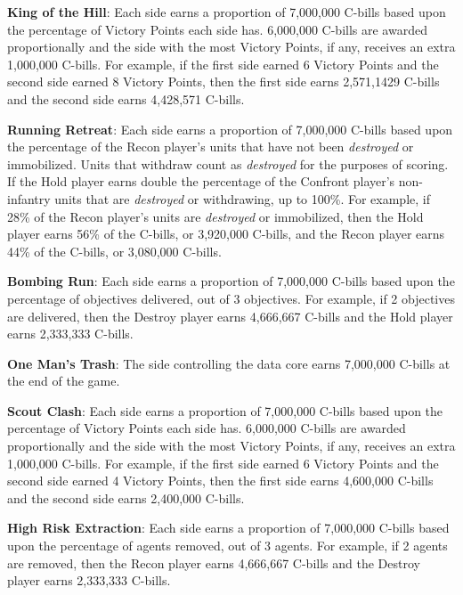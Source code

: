 \begin{description}
\item {\bfseries King of the Hill}: Each side earns a proportion of 7,000,000 C-bills based upon the percentage of Victory Points each side has.
6,000,000 C-bills are awarded proportionally and the side with the most Victory Points, if any, receives an extra 1,000,000 C-bills.
For example, if the first side earned 6 Victory Points and the second side earned 8 Victory Points, then the first side earns 2,571,1429 C-bills and the second side earns 4,428,571 C-bills.

\item {\bfseries Running Retreat}: Each side earns a proportion of 7,000,000 C-bills based upon the percentage of the Recon player's units that have not been \emph{destroyed} or immobilized.
Units that withdraw count as \emph{destroyed} for the purposes of scoring.
If the Hold player earns double the percentage of the Confront player's non-infantry units that are \emph{destroyed} or withdrawing, up to 100\%.
For example, if 28\% of the Recon player's units are \emph{destroyed} or immobilized, then the Hold player earns 56\% of the C-bills, or 3,920,000 C-bills, and the Recon player earns 44\% of the C-bills, or 3,080,000 C-bills.

\item {\bfseries Bombing Run}: Each side earns a proportion of 7,000,000 C-bills based upon the percentage of objectives delivered, out of 3 objectives.
For example, if 2 objectives are delivered, then the Destroy player earns 4,666,667 C-bills and the Hold player earns 2,333,333 C-bills.

\item {\bfseries One Man's Trash}: The side controlling the data core earns 7,000,000 C-bills at the end of the game.

\item {\bfseries Scout Clash}: Each side earns a proportion of 7,000,000 C-bills based upon the percentage of Victory Points each side has.
6,000,000 C-bills are awarded proportionally and the side with the most Victory Points, if any, receives an extra 1,000,000 C-bills.
For example, if the first side earned 6 Victory Points and the second side earned 4 Victory Points, then the first side earns 4,600,000 C-bills and the second side earns 2,400,000 C-bills.

\item {\bfseries High Risk Extraction}: Each side earns a proportion of 7,000,000 C-bills based upon the percentage of agents removed, out of 3 agents.
For example, if 2 agents are removed, then the Recon player earns 4,666,667 C-bills and the Destroy player earns 2,333,333 C-bills.


\end{description}
